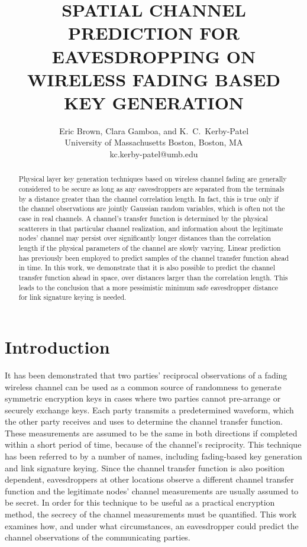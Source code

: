 \documentclass{allertonproc}
\title{SPATIAL CHANNEL PREDICTION FOR EAVESDROPPING ON WIRELESS FADING BASED KEY GENERATION} %
\author{Eric Brown, Clara Gamboa, and K.~C.~Kerby-Patel\\University of Massachusetts Boston, Boston, MA\\kc.kerby-patel@umb.edu} %
\date{} %
\begin{document}
\maketitle


\begin{abstract}

Physical layer key generation techniques based on wireless channel fading are generally considered to be secure as long as any eavesdroppers are separated from the terminals by a distance greater than the channel correlation length.  In fact, this is true only if the channel observations are jointly Gaussian random variables, which is often not the case in real channels.  A channel's transfer function is determined by the physical scatterers in that particular channel realization, and information about the legitimate nodes' channel may persist over significantly longer distances than the correlation length if the physical parameters of the channel are slowly varying.  Linear prediction has previously been employed to predict samples of the channel transfer function ahead in time.  In this work, we demonstrate that it is also possible to predict the channel transfer function ahead in space, over distances larger than the correlation length.  This leads to the conclusion that a more pessimistic minimum safe eavesdropper distance for link signature keying is needed.
\end{abstract}


\section{Introduction}
It has been demonstrated \cite{azimisadjadi2007, bloch2008, mathur2008, ye2010} that two parties' reciprocal observations of a fading wireless channel can be used as a common source of randomness to generate symmetric encryption keys in cases where two parties cannot pre-arrange or securely exchange keys.  Each party transmits a predetermined waveform, which the other party receives and uses to determine the channel transfer function.  These measurements are assumed to be the same in both directions if completed within a short period of time, because of the channel's reciprocity.  This technique has been referred to by a number of names, including fading-based key generation and link signature keying.  Since the channel transfer function is also position dependent, eavesdroppers at other locations observe a different channel transfer function and the legitimate nodes' channel measurements are usually assumed to be secret.  In order for this technique to be useful as a practical encryption method, the secrecy of the channel measurements must be quantified.  This work examines how, and under what circumstances, an eavesdropper could predict the channel observations of the communicating parties.
\end{document}
